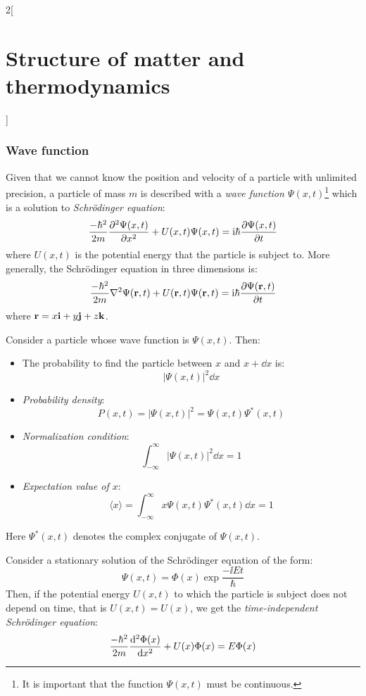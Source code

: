 \documentclass[../../../main.tex]{subfiles}
\begin{document}
\begin{multicols}{2}[\section{Structure of matter and thermodynamics}]
  \subsubsection*{Wave function}
  \begin{definition}
    Given that we cannot know the position and velocity of a particle with unlimited precision, a particle of mass $m$ is described with a \textit{wave function $\Psi(x,t)$}\footnote{It is important that the function $\Psi(x,t)$ must be continuous.} which is a solution to \textit{Schrödinger equation}:
    $$\frac{-\hbar^2}{2m}\pdv[2]{\Psi(x,t)}{x}+U(x,t)\Psi(x,t)=\mathrm{i}\hbar\pdv{\Psi(x,t)}{t}$$
    where $U(x,t)$ is the potential energy that the particle is subject to. More generally, the Schrödinger equation in three dimensions is:
    $$\frac{-\hbar^2}{2m}\nabla^2\Psi(\vb{r},t)+U(\vb{r},t)\Psi(\vb{r},t)=\mathrm{i}\hbar\pdv{\Psi(\vb{r},t)}{t}$$ where $\vb{r}=x\vb{i}+y\vb{j}+z\vb{k}$.
  \end{definition}
  \begin{prop}
    Consider a particle whose wave function is $\Psi(x,t)$. Then:
    \begin{itemize}
      \item The probability to find the particle between $x$ and $x+\dd x$ is: $$|\Psi(x,t)|^2\dd x$$
      \item \textit{Probability density}: $$P(x,t)=|\Psi(x,t)|^2=\Psi(x,t)\Psi^*(x,t)$$
      \item \textit{Normalization condition}: $$\int_{-\infty}^\infty|\Psi(x,t)|^2\dd x=1$$
      \item \textit{Expectation value of $x$}: $$\langle x\rangle=\int_{-\infty}^\infty x\Psi(x,t)\Psi^*(x,t)\dd x=1$$
    \end{itemize}
    Here $\Psi^*(x,t)$ denotes the complex conjugate of $\Psi(x,t)$.
  \end{prop}
  \begin{definition}
    Consider a stationary solution of the Schrö\-din\-ger equation of the form: $$\Psi(x,t)=\Phi(x)\exp{\frac{-\ii Et}{\hbar}}$$
    Then, if the potential energy $U(x,t)$ to which the particle is subject does not depend on time, that is $U(x,t)=U(x)$, we get the \textit{time-independent Schrödinger equation}:
    \begin{equation}\label{SMT-TI_schrodinger}
      \frac{-\hbar^2}{2m}\dv[2]{\Phi(x)}{x}+U(x)\Phi(x)=E\Phi(x)
    \end{equation}

\end{definition}
\end{multicols}
\end{document}
